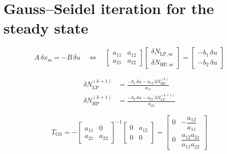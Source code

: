 \documentclass[11pt,a4paper]{article}
\begin{document}
\section{Gauss--Seidel iteration for the steady state}

\begin{equation}
  A\,\delta x_{\mathrm{ss}} = -B\,\delta u
  \quad\Longleftrightarrow\quad
  \begin{bmatrix} a_{11} & a_{12} \\ a_{21} & a_{22} \end{bmatrix}
  \begin{bmatrix} \delta N_{\mathrm{LP,ss}} \\ \delta N_{\mathrm{HP,ss}} \end{bmatrix}
  = \begin{bmatrix} -b_1\,\delta u \\ -b_2\,\delta u \end{bmatrix}
  \label{eq:gs-system}
\end{equation}

\begin{align}
  \delta N_{\mathrm{LP}}^{(k+1)} &= \frac{-b_1\,\delta u - a_{12}\,\delta N_{\mathrm{HP}}^{(k)}}{a_{11}}
  \label{eq:gs-lp} \\[4pt]
  \delta N_{\mathrm{HP}}^{(k+1)} &= \frac{-b_2\,\delta u - a_{21}\,\delta N_{\mathrm{LP}}^{(k+1)}}{a_{22}}
  \label{eq:gs-hp}
\end{align}

\begin{equation}
  T_{\mathrm{GS}} = -\begin{bmatrix} a_{11} & 0 \\ a_{21} & a_{22} \end{bmatrix}^{-1}
                     \begin{bmatrix} 0 & a_{12} \\ 0 & 0 \end{bmatrix}
  = \begin{bmatrix} 0 & -\dfrac{a_{12}}{a_{11}} \\[10pt] 0 & \dfrac{a_{12}a_{21}}{a_{11}a_{22}} \end{bmatrix}
  \label{eq:gs-matrix}
\end{equation}
\end{document}
